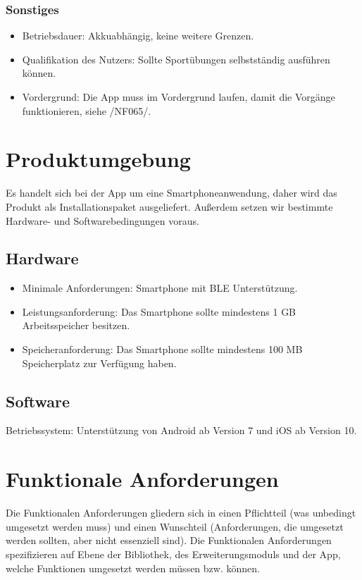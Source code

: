 \documentclass[a4paper,12pt]{article}
\begin{document}
    \subsubsection{Sonstiges}
    \begin{itemize}
      \item \textsf{Betriebsdauer:} \glqq Akkuabhängig\grqq, keine weitere Grenzen.
      \item \textsf{Qualifikation des Nutzers:} Sollte Sportübungen selbstständig ausführen können.
      \item \textsf{Vordergrund:} Die App muss im Vordergrund laufen, damit die Vorgänge funktionieren, siehe /NF065/.
    \end{itemize}
\clearpage
\section{Produktumgebung}
Es handelt sich bei der App um eine Smartphoneanwendung, daher wird das Produkt als Installationspaket ausgeliefert. Außerdem setzen wir bestimmte Hardware- und Softwarebedingungen voraus.
\subsection{Hardware} 
\begin{itemize}
  \item \textsf{Minimale Anforderungen:} Smartphone mit \Gls{BLE} Unterstützung. 
  \item \textsf{Leistungsanforderung:} Das Smartphone sollte mindestens 1 GB Arbeitsspeicher besitzen.
  \item \textsf{Speicheranforderung:} Das Smartphone sollte mindestens 100 MB Speicherplatz zur Verfügung haben.
\end{itemize}

\subsection{Software} 
	\textsf{Betriebssystem:} Unterstützung von Android ab Version 7 und iOS ab Version 10.

\vspace{1cm}
\section{Funktionale Anforderungen}
Die Funktionalen Anforderungen gliedern sich in einen Pflichtteil (was unbedingt umgesetzt werden muss) und einen Wunschteil (Anforderungen, die umgesetzt werden sollten, aber nicht essenziell sind). Die Funktionalen Anforderungen spezifizieren auf Ebene der Bibliothek, des Erweiterungsmoduls und der App, welche Funktionen umgesetzt werden müssen bzw. können. 
\end{document}

